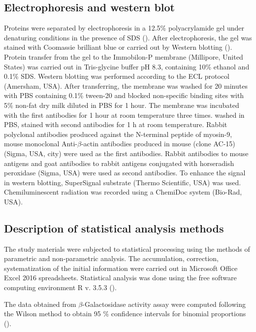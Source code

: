 \documentclass[alpha-refs]{wiley-article}
\begin{document}
\subsection{Electrophoresis and western blot}

Proteins were separated by electrophoresis in a 12.5\%  polyacrylamide gel under denaturing conditions in the presence of SDS (\cite{laemmli1970cleavage}).
After electrophoresis, the gel was stained with Coomassie brilliant blue or carried out by Western blotting (\cite{towbin1979electrophoretic}).
Protein transfer from the gel to the Immobilon-P membrane (Millipore, United States) was carried out in Tris-glycine buffer pH 8.3, containing 10\% ethanol and 0.1\% SDS.
Western blotting was performed according to the ECL protocol (Amersham, USA).
After transferring, the membrane was washed for 20 minutes with PBS containing 0.1\% tween-20 and blocked non-specific binding sites with 5\% non-fat dry milk diluted in PBS for 1 hour.
The membrane was incubated with the first antibodies for 1 hour at room temperature three times. washed in PBS, stained with second antibodies for 1 h at room temperature.
Rabbit polyclonal antibodies produced against the N-terminal peptide of myosin-9, mouse monoclonal Anti-$\beta$-actin antibodies produced in mouse (clone AC-15) (Sigma, USA, city) were used as the first antibodies.
Rabbit antibodies to mouse antigens and goat antibodies to rabbit antigens conjugated with horseradish peroxidase (Sigma, USA) were used as second antibodies.
To enhance the signal in western blotting, SuperSignal substrate (Thermo Scientific, USA) was used.
Chemiluminescent radiation was recorded using a ChemiDoc system (Bio-Rad, USA).

\subsection{Description of statistical analysis methods}

The study materials were subjected to statistical processing using the methods of parametric and non-parametric analysis.
The accumulation, correction, systematization of the initial information were carried out in Microsoft Office Excel 2016 spreadsheets.
Statistical analysis was done using the free software computing environment R v. 3.5.3 (\cite{team2014r}).

The data obtained from $\beta$-Galactosidase activity assay were computed following the Wilson method to obtain 95 \% confidence intervals for binomial proportions (\cite{wilson1927probable}).
\end{document}
